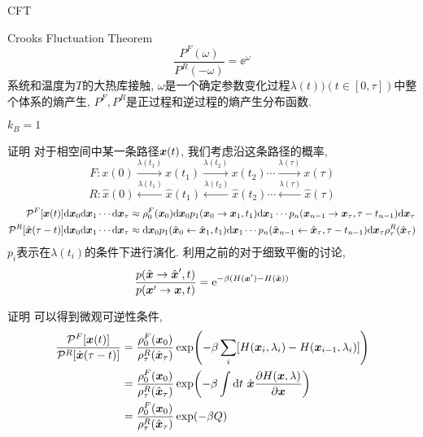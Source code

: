     \begin{frame}{CFT}
        \begin{alertblock}{Crooks Fluctuation Theorem}
            \begin{equation}
                \frac{P^F(\omega)}{P^R(-\omega)} = \ee^{\omega}
            \end{equation}
            系统和温度为$T$的大热库接触, $\omega$是一个确定参数变化过程$\lambda(t))(t\in[0,\tau])$中整个体系的熵产生, $P^F,P^R$是正过程和逆过程的熵产生分布函数.
        \end{alertblock}
        $k_B = 1$
    \end{frame}
    \begin{frame}{证明}
        对于相空间中某一条路径$\vb*x(t)$, 我们考虑沿这条路径的概率,
        $$
        F: x(0)\xrightarrow{\lambda(t_1)}x(t_1)\xrightarrow{\lambda(t_2)}x(t_2)\cdots \xrightarrow{\lambda(\tau)}x(\tau)
        $$
        $$
        R:  \hat x(0)\xleftarrow{\lambda(t_1)}\hat x(t_1)\xleftarrow{\lambda(t_2)}\hat x(t_2)\cdots \xleftarrow{\lambda(\tau)}\hat x(\tau)
        $$
        \begin{equation}
            \begin{split}
                \mathcal{P}^F[\vb*x(t)]\dd\vb*x_0\dd\vb*x_1\cdots\dd\vb*x_\tau &\approx\rho^F_0(\vb*x_0) \dd \vb*x_0p_1(\vb*x_0\to\vb*x_1,t_1)\dd\vb*x_1 \cdots p_n(\vb*x_{n-1}\to\vb*x_\tau,\tau-t_{n-1})\dd\vb*x_\tau\\
                \mathcal{P}^R[\hat{\vb*x}(\tau-t)]\dd\vb*x_0\dd\vb*x_1\cdots\dd\vb*x_\tau &\approx \dd\vb*x_0p_1(\hat{\vb*x}_0\leftarrow\hat{\vb*x}_1,t_1)\dd\vb*x_1 \cdots p_n(\hat{\vb*x}_{n-1}\leftarrow\hat{\vb*x}_\tau,\tau-t_{n-1})\dd\vb*x_\tau\rho^R_\tau(\hat{\vb*x}_\tau)
            \end{split}
        \end{equation}
        $p_i$表示在$\lambda(t_i)$的条件下进行演化. 利用之前的对于细致平衡的讨论,
        \[\dfrac{p(\hat{\vb*x}\to\hat{\vb*x}',t)}{p(\vb*x'\to\vb*x,t)} = \mathrm{e}^{-\beta(H(\vb*x') - H(\hat{\vb*x}))}
            \]
    \end{frame}
    \begin{frame}{证明}
        可以得到微观可逆性条件,
        \begin{equation}
            \begin{split}
                \frac{\mathcal{P}^F[\vb*x(t)]}{\mathcal{P}^R[\hat{\vb*x}(\tau-t)]} &= \frac{\rho^F_0(\vb*x_0)}{\rho^R_\tau(\hat{\vb*x}_\tau)}\exp(-\beta\sum_i [H(\vb*x_i,\lambda_i) - H(\vb*x_{i-1},\lambda_i)]) \\
                &= \frac{\rho^F_0(\vb*x_0)}{\rho^R_\tau(\hat{\vb*x}_\tau)}\exp(-\beta\int\dd t\ \dot{\vb*x}\pdv{H(\vb*x,\lambda)}{\vb*x})\\
                &= \frac{\rho^F_0(\vb*x_0)}{\rho^R_\tau(\hat{\vb*x}_\tau)}\exp(-\beta Q)
            \end{split}
        \end{equation}
    \end{frame}
